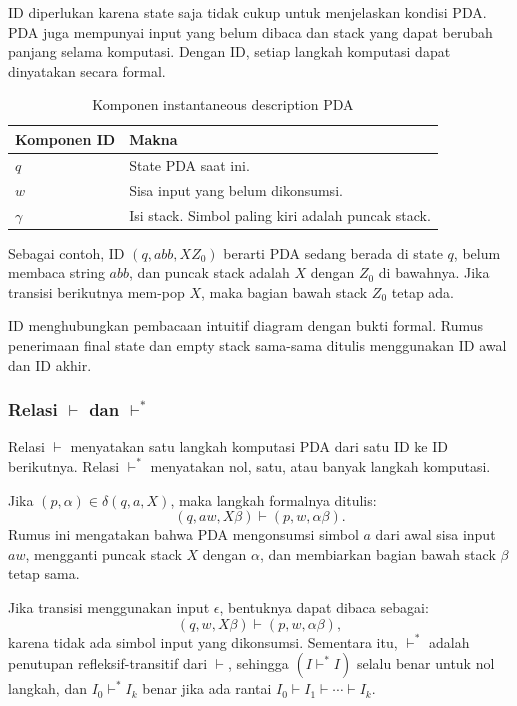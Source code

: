 ID diperlukan karena state saja tidak cukup untuk menjelaskan kondisi PDA. PDA juga mempunyai input yang belum dibaca dan stack yang dapat berubah panjang selama komputasi. Dengan ID, setiap langkah komputasi dapat dinyatakan secara formal.

\begin{table}[H]
\centering
\begin{tabularx}{\textwidth}{|L{0.18\textwidth}|X|}
\hline
\textbf{Komponen ID} & \textbf{Makna} \\
\hline
$q$ & State PDA saat ini. \\
\hline
$w$ & Sisa input yang belum dikonsumsi. \\
\hline
$\gamma$ & Isi stack. Simbol paling kiri adalah puncak stack. \\
\hline
\end{tabularx}
\caption{Komponen instantaneous description PDA}
\label{tab:id-pda}
\end{table}

Sebagai contoh, ID $(q,abb,XZ_0)$ berarti PDA sedang berada di state $q$, belum membaca string $abb$, dan puncak stack adalah $X$ dengan $Z_0$ di bawahnya. Jika transisi berikutnya mem-pop $X$, maka bagian bawah stack $Z_0$ tetap ada.

ID menghubungkan pembacaan intuitif diagram dengan bukti formal. Rumus penerimaan final state dan empty stack sama-sama ditulis menggunakan ID awal dan ID akhir.

\subsubsection{\texorpdfstring{Relasi $\vdash$ dan $\vdash^*$}{Relasi turnstile dan turnstile-star}}

\begin{jawab}
Relasi $\vdash$ menyatakan satu langkah komputasi PDA dari satu ID ke ID berikutnya. Relasi $\vdash^*$ menyatakan nol, satu, atau banyak langkah komputasi.
\end{jawab}

Jika $(p,\alpha)\in\delta(q,a,X)$, maka langkah formalnya ditulis:
\[
    (q,aw,X\beta) \vdash (p,w,\alpha\beta).
\]
Rumus ini mengatakan bahwa PDA mengonsumsi simbol $a$ dari awal sisa input $aw$, mengganti puncak stack $X$ dengan $\alpha$, dan membiarkan bagian bawah stack $\beta$ tetap sama.

Jika transisi menggunakan input $\epsilon$, bentuknya dapat dibaca sebagai:
\[
    (q,w,X\beta) \vdash (p,w,\alpha\beta),
\]
karena tidak ada simbol input yang dikonsumsi. Sementara itu, $\vdash^*$ adalah penutupan refleksif-transitif dari $\vdash$, sehingga $(I \vdash^* I)$ selalu benar untuk nol langkah, dan $I_0 \vdash^* I_k$ benar jika ada rantai $I_0 \vdash I_1 \vdash \cdots \vdash I_k$.

